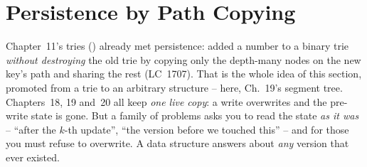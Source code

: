 \section{Persistence by Path Copying}\label{sec:c19-copy}

\begin{previouslybox}
Chapter~11's tries () already met persistence:  added a number to a binary trie \emph{without destroying} the old trie by copying only the depth-many nodes on the new key's path and sharing the rest (LC~1707).  That is the whole idea of this section, promoted from a trie to an arbitrary structure -- here, Ch.~19's segment tree.  Chapters~18, 19 and~20 all keep \emph{one live copy}: a write overwrites and the pre-write state is gone.  But a family of problems asks you to read the state \emph{as it was} -- ``after the \(k\)-th update'', ``the version before we touched this'' -- and for those you must refuse to overwrite.  A  data structure answers about \emph{any} version that ever existed.
\end{previouslybox}

